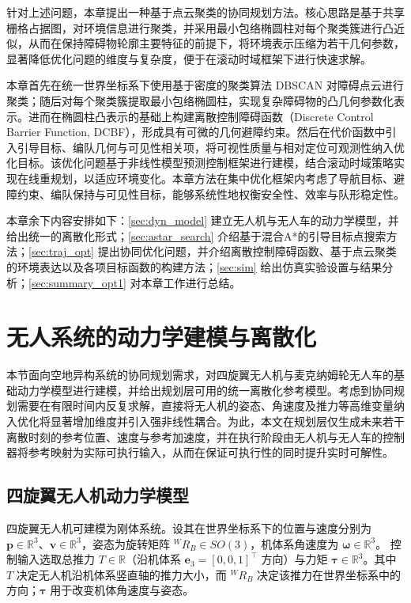 针对上述问题，本章提出一种基于点云聚类的协同规划方法。核心思路是基于共享栅格占据图，对环境信息进行聚类，并采用最小包络椭圆柱对每个聚类簇进行凸近似，从而在保持障碍物轮廓主要特征的前提下，将环境表示压缩为若干几何参数，显著降低优化问题的维度与复杂度，便于在滚动时域框架下进行快速求解。

本章首先在统一世界坐标系下使用基于密度的聚类算法 DBSCAN\cite{dbscan} 对障碍点云进行聚类；随后对每个聚类簇提取最小包络椭圆柱，实现复杂障碍物的凸几何参数化表示。进而在椭圆柱凸表示的基础上构建离散控制障碍函数（Discrete Control Barrier Function, DCBF）\cite{dcbf}，形成具有可微的几何避障约束。然后在代价函数中引入引导目标、编队几何与可见性相关项，将可视性质量与相对定位可观测性纳入优化目标。该优化问题基于非线性模型预测控制框架进行建模，结合滚动时域策略实现在线重规划，以适应环境变化。本章方法在集中优化框架内考虑了导航目标、避障约束、编队保持与可见性目标，能够系统性地权衡安全性、效率与队形稳定性。

本章余下内容安排如下：\autoref{sec:dyn_model} 建立无人机与无人车的动力学模型，并给出统一的离散化形式；\autoref{sec:astar_search} 介绍基于混合A*的引导目标点搜索方法；\autoref{sec:traj_opt} 提出协同优化问题，并介绍离散控制障碍函数、基于点云聚类的环境表达以及各项目标函数的构建方法；\autoref{sec:sim} 给出仿真实验设置与结果分析；\autoref{sec:summary_opt1} 对本章工作进行总结。

\section{无人系统的动力学建模与离散化}\label{sec:dyn_model}

本节面向空地异构系统的协同规划需求，对四旋翼无人机与麦克纳姆轮无人车的基础动力学模型进行建模，并给出规划层可用的统一离散化参考模型。考虑到协同规划需要在有限时间内反复求解，直接将无人机的姿态、角速度及推力等高维变量纳入优化将显著增加维度并引入强非线性耦合。为此，本文在规划层仅生成未来若干离散时刻的参考位置、速度与参考加速度，并在执行阶段由无人机与无人车的控制器将参考映射为实际可执行输入，从而在保证可执行性的同时提升实时可解性。

\subsection{四旋翼无人机动力学模型}\label{subsec:uav_dyn_ctrl}
四旋翼无人机可建模为刚体系统。设其在世界坐标系下的位置与速度分别为
\(\mathbf{p}\in\mathbb{R}^3\)、\(\mathbf{v}\in\mathbb{R}^3\)，姿态为旋转矩阵
\({}^{W}\!R_{B}\in SO(3)\)，机体系角速度为 \(\boldsymbol{\omega}\in\mathbb{R}^3\)。
控制输入选取总推力 \(T\in\mathbb{R}\)（沿机体系 \(\mathbf{e}_3=[0,0,1]^\top\) 方向）与力矩
\(\boldsymbol{\tau}\in\mathbb{R}^3\)。其中 \(T\) 决定无人机沿机体系竖直轴的推力大小，而 \({}^{W}\!R_{B}\) 决定该推力在世界坐标系中的方向；\(\boldsymbol{\tau}\) 用于改变机体角速度与姿态。

